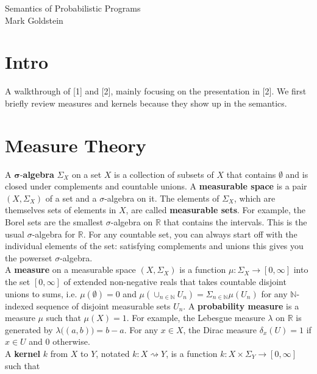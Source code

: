 \documentclass[11pt]{article}
\theoremstyle{definition}
\theoremstyle{plain}
\renewcommand{\b}[1]{\mathbb{#1}}
\begin{document}
\begin{center}
Semantics of Probabilistic Programs\\
Mark Goldstein
\end{center}

\section{Intro}

\noindent A walkthrough of [1] and [2], mainly focusing on the presentation 
in [2]. We first briefly review measures and kernels because
they show up in the semantics.

\section{Measure Theory}

\noindent A $\mathbf{\sigma}$-\textbf{algebra} $\Sigma_X$ on a set $X$ is a collection
of subsets of $X$ that contains $\emptyset$ and is closed under complements
and countable unions. A \textbf{measurable space} is a pair $(X,\Sigma_X)$ of
a set and a $\sigma$-algebra on it. The elements of $\Sigma_X$, which are themselves
sets of elements in $X$, are called \textbf{measurable sets}.
For example, the Borel sets are the smallest $\sigma$-algebra on $\b{R}$ that
contains the intervals. This is the usual $\sigma$-algebra for $\b{R}$. For any countable
set, you can always start off with the individual elements of the set: satisfying
complements and unions this gives you the powerset $\sigma$-algebra.\\

\noindent A \textbf{measure} on a measurable space $(X,\Sigma_X)$ is a function
$\mu: \Sigma_X \rightarrow [0,\infty]$ into the set $[0,\infty]$ of extended
non-negative reals that takes countable disjoint unions to sums, i.e. $\mu(\emptyset)=0$
and $\mu(\cup_{n \in \b{N}} U_n) = \Sigma_{n \in \b{N}} \mu(U_n)$ 
for any $\b{N}$-indexed sequence of disjoint measurable sets $U_n$.
A \textbf{probability measure} is a measure $\mu$ such that $\mu(X)=1$.
For example, the Lebesgue measure $\lambda$ on $\b{R}$ is generated by
$\lambda \Big( (a,b) \Big) = b-a$. For any $x \in X$, the Dirac measure 
$\delta_x(U) = 1$ if $x \in U$ and $0$ otherwise.\\

\noindent A \textbf{kernel} $k$ from $X$ to $Y$, notated
$k: X \rightsquigarrow Y$, is a function $k: X \times \Sigma_Y \rightarrow [0,\infty]$
such that
\end{document}
